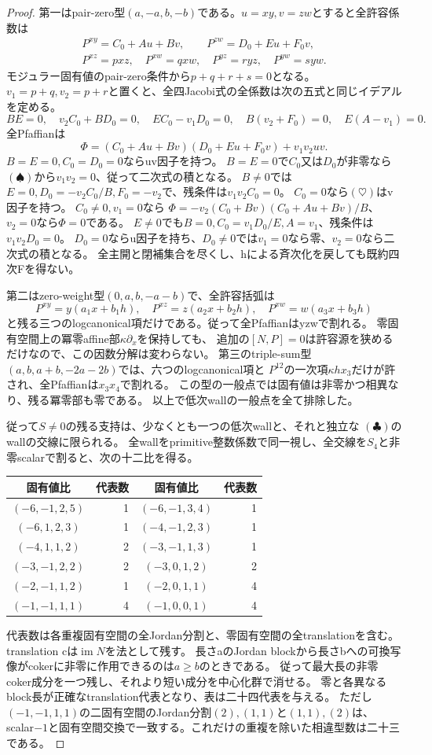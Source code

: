 \documentclass[a4paper,11pt]{ltjsarticle}
\theoremstyle{definition}
\begin{document}
\begin{proof}
第一はpair-zero型$(a,-a,b,-b)$である。$u=xy,v=zw$とすると全許容係数は
\[
\begin{gathered}
 P^{xy}=C_0+Au+Bv,\qquad P^{zw}=D_0+Eu+F_0v,\\
 P^{xz}=p xz,\quad P^{xw}=q xw,\quad P^{yz}=r yz,\quad P^{yw}=s yw.
\end{gathered}
\]
モジュラー固有値のpair-zero条件から$p+q+r+s=0$となる。
$v_1=p+q,v_2=p+r$と置くと、全四Jacobi式の全係数は次の五式と同じイデアルを定める。
\[
 BE=0,\quad v_2C_0+BD_0=0,\quad EC_0-v_1D_0=0,
 \quad B(v_2+F_0)=0,\quad E(A-v_1)=0.                      \tag{\spadesuit}
\]
全Pfaffianは
\[
 \Phi=(C_0+Au+Bv)(D_0+Eu+F_0v)+v_1v_2uv.                 \tag{\heartsuit}
\]
$B=E=0,C_0=D_0=0$ならuv因子を持つ。
$B=E=0$で$C_0$又は$D_0$が非零なら$(\spadesuit)$から$v_1v_2=0$、従って二次式の積となる。
$B\ne0$では$E=0,D_0=-v_2C_0/B,F_0=-v_2$で、残条件は$v_1v_2C_0=0$。
$C_0=0$なら$(\heartsuit)$はv因子を持つ。
$C_0\ne0,v_1=0$なら
$\Phi=-v_2(C_0+Bv)(C_0+Au+Bv)/B$、$v_2=0$なら$\Phi=0$である。
$E\ne0$でも$B=0,C_0=v_1D_0/E,A=v_1$、残条件は$v_1v_2D_0=0$。
$D_0=0$ならu因子を持ち、$D_0\ne0$では$v_1=0$なら零、$v_2=0$なら二次式の積となる。
全主開と閉補集合を尽くし、hによる斉次化を戻しても既約四次Fを得ない。

第二はzero-weight型$(0,a,b,-a-b)$で、全許容括弧は
\[
 P^{xy}=y(a_1x+b_1h),\quad P^{xz}=z(a_2x+b_2h),\quad
 P^{xw}=w(a_3x+b_3h)
\]
と残る三つのlogcanonical項だけである。従って全Pfaffianはyzwで割れる。
零固有空間上の冪零affine部$\kappa\partial_x$を保持しても、
追加の$[N,P]=0$は許容源を狭めるだけなので、この因数分解は変わらない。
第三のtriple-sum型$(a,b,a+b,-2a-2b)$では、六つのlogcanonical項と
$P^{12}$の一次項$\kappa h x_3$だけが許され、全Pfaffianは$x_3x_4$で割れる。
この型の一般点では固有値は非零かつ相異なり、残る冪零部も零である。
以上で低次wallの一般点を全て排除した。

従って$S\ne0$の残る支持は、少なくとも一つの低次wallと、それと独立な
$(\clubsuit)$のwallの交線に限られる。
全wallをprimitive整数係数で同一視し、全交線を$S_4$と非零scalarで割ると、次の十二比を得る。
\begin{center}\small
\begin{tabular}{c|r@{\qquad}c|r}
固有値比&代表数&固有値比&代表数\\\hline
$(-6,-1,2,5)$&1&$(-6,-1,3,4)$&1\\
$(-6,1,2,3)$&1&$(-4,-1,2,3)$&1\\
$(-4,1,1,2)$&2&$(-3,-1,1,3)$&1\\
$(-3,-1,2,2)$&2&$(-3,0,1,2)$&2\\
$(-2,-1,1,2)$&1&$(-2,0,1,1)$&4\\
$(-1,-1,1,1)$&4&$(-1,0,0,1)$&4
\end{tabular}
\end{center}
代表数は各重複固有空間の全Jordan分割と、零固有空間の全translationを含む。
translation cは$\operatorname{im}N$を法として残す。
長さaのJordan blockから長さbへの可換写像がcokerに非零に作用できるのは$a\ge b$のときである。
従って最大長の非零coker成分を一つ残し、それより短い成分を中心化群で消せる。
零と各異なるblock長が正確なtranslation代表となり、表は二十四代表を与える。
ただし$(-1,-1,1,1)$の二固有空間のJordan分割$(2),(1,1)$と$(1,1),(2)$は、
scalar$-1$と固有空間交換で一致する。これだけの重複を除いた相違型数は二十三である。


\end{proof}
\end{document}

